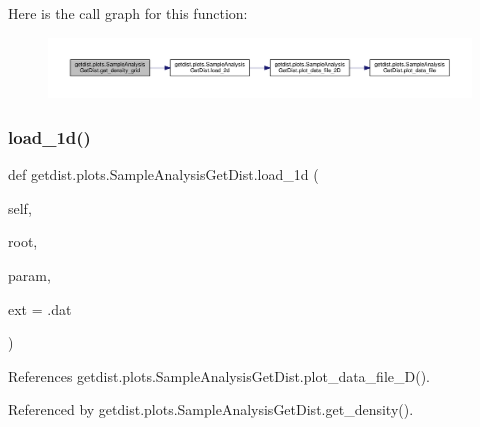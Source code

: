 Here is the call graph for this function\+:
\nopagebreak
\begin{figure}[H]
\begin{center}
\leavevmode
\includegraphics[width=350pt]{classgetdist_1_1plots_1_1SampleAnalysisGetDist_a0dd526731ad07af55ecee518231c7a28_cgraph}
\end{center}
\end{figure}
\mbox{\label{classgetdist_1_1plots_1_1SampleAnalysisGetDist_af7814cfa5b531528542279c3d50473c7}} 
\subsubsection{\texorpdfstring{load\+\_\+1d()}{load\_1d()}}
{\footnotesize\ttfamily def getdist.\+plots.\+Sample\+Analysis\+Get\+Dist.\+load\+\_\+1d (\begin{DoxyParamCaption}\item[{}]{self,  }\item[{}]{root,  }\item[{}]{param,  }\item[{}]{ext = {\ttfamily \textquotesingle{}.dat\textquotesingle{}} }\end{DoxyParamCaption})}



References getdist.\+plots.\+Sample\+Analysis\+Get\+Dist.\+plot\+\_\+data\+\_\+file\+\_\+D().



Referenced by getdist.\+plots.\+Sample\+Analysis\+Get\+Dist.\+get\+\_\+density().

